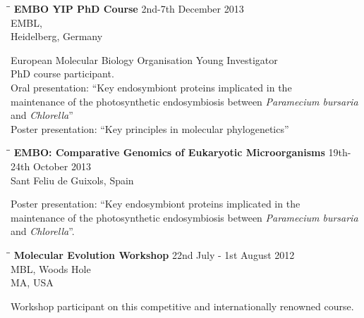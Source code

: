 \documentclass{res}
\begin{document}
\begin{resume}
\begin{tabbing}
\hspace{2in}\= \hspace{2.6in}\= \kill
{\bf EMBO YIP PhD Course} \> \> 2nd-7th December 2013\\
\> \> EMBL, \\
\> \> Heidelberg, Germany\\
\end{tabbing}\vspace{-40pt}
European Molecular Biology Organisation Young Investigator \\
PhD course participant. \\
Oral presentation: ``Key endosymbiont proteins implicated in the \\ maintenance of the photosynthetic endosymbiosis between \textit{Paramecium bursaria} \\ and \textit{Chlorella}''\\
Poster presentation: ``Key principles in molecular phylogenetics''

\vspace{-0.1in}
     \begin{tabbing} 
   \hspace{2in}\= \hspace{2.6in}\= \kill 
    {\bf EMBO: Comparative Genomics of Eukaryotic Microorganisms}
    \>  \> 19th-24th October 2013\\
                         \>    \> Sant Feliu de Guixols, Spain
   \end{tabbing}\vspace{-20pt}      
      Poster presentation: ``Key endosymbiont proteins implicated in the \\ maintenance of the photosynthetic endosymbiosis between \textit{Paramecium bursaria} \\ and \textit{Chlorella}''.
      \vspace{-0.1in}

\begin{tabbing}
\hspace{2in}\= \hspace{2.6in}\= \kill
{\bf Molecular Evolution Workshop} \> \> 22nd July - 1st August 2012\\
\> \> MBL, Woods Hole \\
\> \> MA, USA \\
\end{tabbing}\vspace{-40pt}
Workshop participant on this competitive and internationally renowned course.
  

\end{resume}
\end{document}
